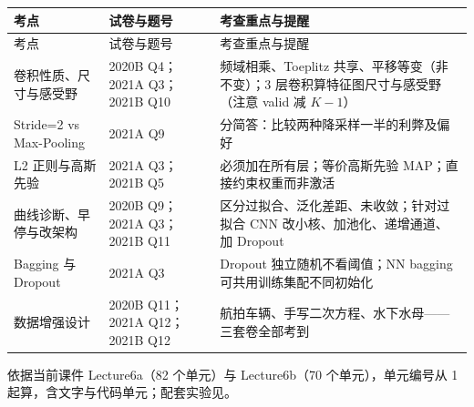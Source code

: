 \begingroup\small\setlength{\tabcolsep}{3pt}\renewcommand{\arraystretch}{1.22}
\begin{longtable}{@{}>{\raggedright\arraybackslash}p{}>{\raggedright\arraybackslash}p{}>{\raggedright\arraybackslash}p{}@{}}
\toprule
考点 & 试卷与题号 & 考查重点与提醒 \\
\midrule\endfirsthead
考点 & 试卷与题号 & 考查重点与提醒 \\
\midrule\endhead
\bottomrule\endfoot
卷积性质、尺寸与感受野 & 2020B Q4；2021A Q3；2021B Q10 & 频域相乘、Toeplitz 共享、平移等变（非不变）；3 层卷积算特征图尺寸与感受野（注意 valid 减 $K-1$） \\
Stride=2 vs Max-Pooling & 2021A Q9 & 10 分简答：比较两种降采样一半的利弊及偏好 \\
L2 正则与高斯先验 & 2021A Q3；2021B Q5 & 必须加在所有层；等价高斯先验 MAP；直接约束权重而非激活 \\
曲线诊断、早停与改架构 & 2020B Q9；2021A Q3；2021B Q11 & 区分过拟合、泛化差距、未收敛；针对过拟合 CNN 改小核、加池化、递增通道、加 Dropout \\
Bagging 与 Dropout & 2021A Q3 & Dropout 独立随机不看阈值；NN bagging 可共用训练集配不同初始化 \\
数据增强设计 & 2020B Q11；2021A Q12；2021B Q12 & 航拍车辆、手写二次方程、水下水母——三套卷全部考到 \\
\end{longtable}\endgroup



依据当前课件 Lecture6a（82 个单元）与 Lecture6b（70 个单元），单元编号从 1 起算，含文字与代码单元；配套实验见。

